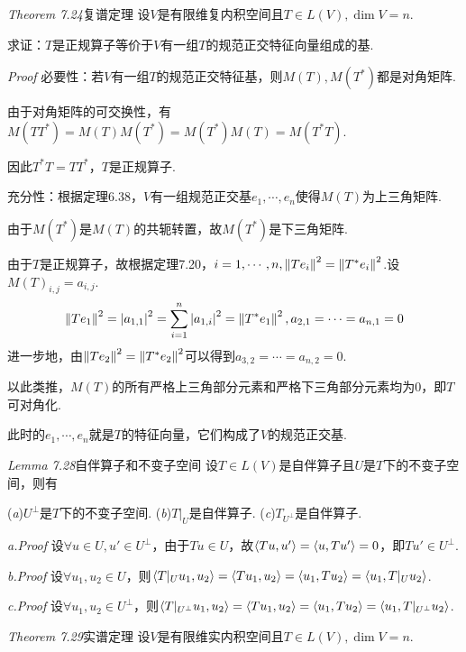 \textit{Theorem 7.24}{\kaishu 复谱定理}
设\(V\)是有限维复内积空间且\(T \in L(V),\dim V=n\).

求证：\(T\)是正规算子等价于\(V\)有一组\(T\)的规范正交特征向量组成的基.

\textit{Proof}
必要性：若\(V\)有一组\(T\)的规范正交特征基，则\(M(T),M(T^*)\)都是对角矩阵.

由于对角矩阵的可交换性，有\(M(TT^*)=M(T)M(T^*)=M(T^*)M(T)=M(T^*T)\).

因此\(T^*T=TT^*\)，\(T\)是正规算子.

充分性：根据定理6.38，\(V\)有一组规范正交基\(e_1,\cdots,e_n\)使得\(M(T)\)为上三角矩阵.

由于\(M(T^*)\)是\(M(T)\)的共轭转置，故\(M(T^*)\)是下三角矩阵.

由于\(T\)是正规算子，故根据定理7.20，\(i=1,\cdots,n,\left\lVert Te_i \right\rVert^2=\left\lVert T^*e_i \right\rVert^2\).设\(M(T)_{i,j}=a_{i,j}\).
    \begin{align*}
        \left\lVert Te_1 \right\rVert^2=\left\lvert a_{1,1} \right\rvert^2=\sum_{i=1}^n \left\lvert a_{1,i} \right\rvert^2=\left\lVert T^*e_1 \right\rVert^2,a_{2,1}=\cdots=a_{n,1}=0
    \end{align*}
进一步地，由\(\left\lVert Te_2 \right\rVert^2=\left\lVert T^*e_2 \right\rVert^2\)可以得到\(a_{3,2}=\cdots=a_{n,2}=0\).

以此类推，\(M(T)\)的所有严格上三角部分元素和严格下三角部分元素均为\(0\)，即\(T\)可对角化.

此时的\(e_1,\cdots,e_n\)就是\(T\)的特征向量，它们构成了\(V\)的规范正交基.

\hspace*{\fill}

\textit{Lemma 7.28}{\kaishu 自伴算子和不变子空间}
设\(T \in L(V)\)是自伴算子且\(U\)是\(T\)下的不变子空间，则有

(\textit{a})\(U^\bot\)是\(T\)下的不变子空间. \quad
(\textit{b})\(T|_U\)是自伴算子. \quad
(\textit{c})\(T_{U^\bot}\)是自伴算子.

\textit{a.Proof}
设\(\forall u \in U,u' \in U^\bot\)，由于\(Tu \in U\)，故\(\left\langle Tu,u' \right\rangle=\left\langle u,Tu' \right\rangle=0\)，即\(Tu' \in U^\bot\).

\textit{b.Proof}
设\(\forall u_1,u_2 \in U\)，则\(\left\langle T|_U u_1,u_2 \right\rangle=\left\langle Tu_1,u_2 \right\rangle=\left\langle u_1,Tu_2 \right\rangle=\left\langle u_1,T|_U u_2 \right\rangle\).

\textit{c.Proof}
设\(\forall u_1,u_2 \in U^\bot\)，则\(\left\langle T|_{U^\bot}u_1,u_2 \right\rangle=\left\langle Tu_1,u_2 \right\rangle=\left\langle u_1,Tu_2 \right\rangle=\left\langle u_1,T|_{U^\bot}u_2 \right\rangle\).

\hspace*{\fill}

\textit{Theorem 7.29}{\kaishu 实谱定理}
设\(V\)是有限维实内积空间且\(T \in L(V),\dim V=n\).

